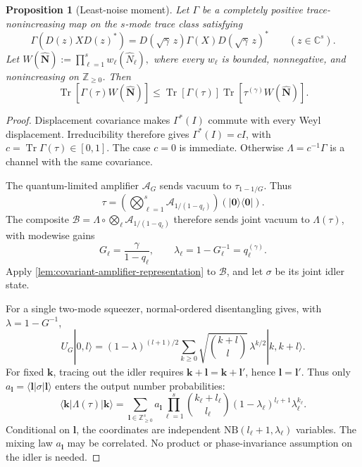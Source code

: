 \documentclass[11pt]{article}
\newtheorem{proposition}[proposition]{Proposition}
\theoremstyle{remark}
\theoremstyle{plain}
\newcommand{\cA}{\mathcal A}
\newcommand{\Tr}{\operatorname{Tr}}
\newcommand{\ket}[1]{|#1\rangle}
\newcommand{\proj}[1]{|#1\rangle\!\langle #1|}
\begin{document}
\begin{proposition}[Least-noise moment]
\label{prop:least-noise-moment}
Let \(\Gamma\) be a completely positive trace-nonincreasing map on the
\(s\)-mode trace class satisfying
\[
  \Gamma(D(z)XD(z)^*)
  =D(\sqrt\gamma\,z)\Gamma(X)D(\sqrt\gamma\,z)^*
  \qquad(z\in\mathbb C^s).
\]
Let
\(
  W(\widehat{\mathbf N}):=\prod_{\ell=1}^s w_\ell(\widehat N_\ell),
\)
where every \(w_\ell\) is bounded, nonnegative, and nonincreasing on
\(\mathbb Z_{\ge0}\).  Then
\begin{equation}\label{eq:least-noise-moment}
  \Tr[\Gamma(\tau)W(\widehat{\mathbf N})]
  \le\Tr[\Gamma(\tau)]
       \Tr[\tau^{(\gamma)}W(\widehat{\mathbf N})].
\end{equation}
\end{proposition}

\begin{proof}
Displacement covariance makes \(\Gamma^*(I)\) commute with every Weyl
displacement.  Irreducibility therefore gives \(\Gamma^*(I)=cI\), with
\(c=\Tr\Gamma(\tau)\in[0,1]\).  The case \(c=0\) is immediate. Otherwise
\(\Lambda=c^{-1}\Gamma\) is a channel with the same covariance.

The quantum-limited amplifier \(\cA_G\) sends vacuum to
\(\tau_{1-1/G}\).  Thus
\begin{equation}\label{eq:thermal-as-amplified-vacuum}
  \tau=\left(\bigotimes_{\ell=1}^s\cA_{1/(1-q_\ell)}\right)
        (\proj{\mathbf0}).
\end{equation}
The composite
\(\mathcal B=\Lambda\circ\bigotimes_\ell\cA_{1/(1-q_\ell)}\)
therefore sends joint vacuum to \(\Lambda(\tau)\), with modewise gains
\[
  G_\ell=\frac{\gamma}{1-q_\ell},\qquad
  \lambda_\ell=1-G_\ell^{-1}=q_\ell^{(\gamma)}.
\]
Apply \cref{lem:covariant-amplifier-representation} to \(\mathcal B\),
and let \(\sigma\) be its joint idler state.

For a single two-mode squeezer, normal-ordered disentangling
\cite{BarnettRadmore1997} gives, with \(\lambda=1-G^{-1}\),
\begin{equation}\label{eq:seeded-amplifier-expansion}
  U_G\ket{0,l}
  =(1-\lambda)^{(l+1)/2}
   \sum_{k\ge0}\sqrt{\binom{k+l}{l}}\,
   \lambda^{k/2}\ket{k,k+l}.
\end{equation}
For fixed \(\mathbf k\), tracing out the idler requires
\(\mathbf k+\mathbf l=\mathbf k+\mathbf l'\), hence
\(\mathbf l=\mathbf l'\).  Thus only
\(a_{\mathbf l}=\langle\mathbf l|\sigma|\mathbf l\rangle\)
enters the output number probabilities:
\begin{equation}\label{eq:multimode-negative-binomial-law}
  \langle\mathbf k|\Lambda(\tau)|\mathbf k\rangle
  =\sum_{\mathbf l\in\mathbb Z_{\ge0}^s}a_{\mathbf l}
    \prod_{\ell=1}^s
    \binom{k_\ell+l_\ell}{l_\ell}
    (1-\lambda_\ell)^{l_\ell+1}\lambda_\ell^{k_\ell}.
\end{equation}
Conditional on \(\mathbf l\), the coordinates are independent
\(\mathrm{NB}(l_\ell+1,\lambda_\ell)\) variables. The mixing law
\(a_{\mathbf l}\) may be correlated.  No product or phase-invariance
assumption on the idler is needed.


\end{proof}
\end{document}
